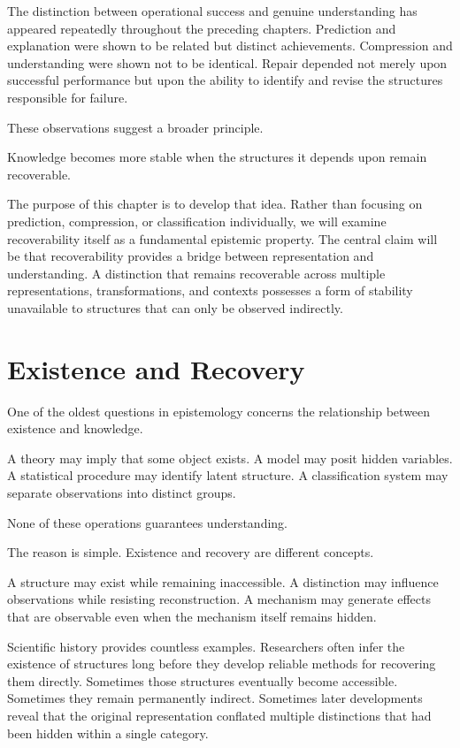 \documentclass[11pt,oneside,openany]{book}
\begin{document}
The distinction between operational success and genuine understanding has appeared repeatedly throughout the preceding chapters. Prediction and explanation were shown to be related but distinct achievements. Compression and understanding were shown not to be identical. Repair depended not merely upon successful performance but upon the ability to identify and revise the structures responsible for failure.

These observations suggest a broader principle.

Knowledge becomes more stable when the structures it depends upon remain recoverable.

The purpose of this chapter is to develop that idea. Rather than focusing on prediction, compression, or classification individually, we will examine recoverability itself as a fundamental epistemic property. The central claim will be that recoverability provides a bridge between representation and understanding. A distinction that remains recoverable across multiple representations, transformations, and contexts possesses a form of stability unavailable to structures that can only be observed indirectly.

\section{Existence and Recovery}

One of the oldest questions in epistemology concerns the relationship between existence and knowledge.

A theory may imply that some object exists. A model may posit hidden variables. A statistical procedure may identify latent structure. A classification system may separate observations into distinct groups.

None of these operations guarantees understanding.

The reason is simple. Existence and recovery are different concepts.

A structure may exist while remaining inaccessible. A distinction may influence observations while resisting reconstruction. A mechanism may generate effects that are observable even when the mechanism itself remains hidden.

Scientific history provides countless examples. Researchers often infer the existence of structures long before they develop reliable methods for recovering them directly. Sometimes those structures eventually become accessible. Sometimes they remain permanently indirect. Sometimes later developments reveal that the original representation conflated multiple distinctions that had been hidden within a single category.
\end{document}
